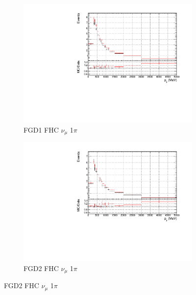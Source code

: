 \begin{figure}[!h]
\begin{subfigure}{0.49\textwidth}
  \centering
  \includegraphics[width=\textwidth]{figs/prioronly1D_p_FGD1_numuCC_1pi}
  \caption{FGD1 FHC $\nu_{\mu}$ 1$\pi$}
\end{subfigure}
\begin{subfigure}{0.49\textwidth}
  \centering
  \includegraphics[width=\textwidth]{figs/prioronly1D_p_FGD2_numuCC_1pi}
  \caption{FGD2 FHC $\nu_{\mu}$ 1$\pi$}
\end{subfigure}


\end{figure}
